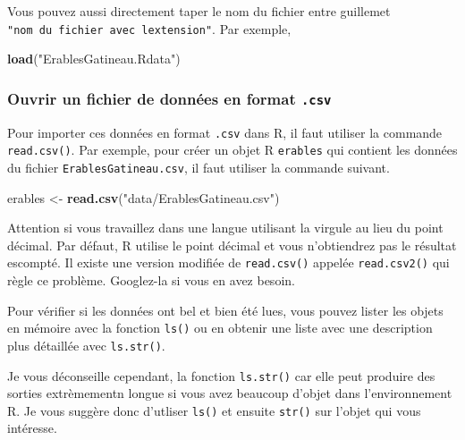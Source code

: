\documentclass[12pt,]{book}
\makeatletter
\newenvironment{Shaded}{\begin{snugshade}}{\end{snugshade}}
\newcommand{\KeywordTok}[1]{\textcolor[rgb]{0.27,0.27,0.27}{\textbf{#1}}}
\newcommand{\NormalTok}[1]{#1}
\newcommand{\StringTok}[1]{\textcolor[rgb]{0.5,0.5,0.5}{#1}}
\newenvironment{kframe}{%
\medskip{}
\setlength{\fboxsep}{.8em}
 \def\at@end@of@kframe{}%
 \ifinner\ifhmode%
  \def\at@end@of@kframe{\end{minipage}}%
  \begin{minipage}{\columnwidth}%
 \fi\fi%
 \def\FrameCommand##1{\hskip\@totalleftmargin \hskip-\fboxsep
 \colorbox{shadecolor}{##1}\hskip-\fboxsep
     \hskip-\linewidth \hskip-\@totalleftmargin \hskip\columnwidth}%
 \MakeFramed {\advance\hsize-\width
   \@totalleftmargin\z@ \linewidth\hsize
   \@setminipage}}%
 {\par\unskip\endMakeFramed%
 \at@end@of@kframe}
\newenvironment{rmdblock}[1]
  {
  \begin{itemize}
  \renewcommand{\labelitemi}{
    \raisebox{-.7\height}[0pt][0pt]{
      {\setkeys{Gin}{width=3em,keepaspectratio}\texttt{[image: images/\#1]}}
    }
  }
  \setlength{\fboxsep}{1em}
  \begin{kframe}
  \item
  }
  {
  \end{kframe}
  \end{itemize}
  }
\newenvironment{rmdtip}
  {\begin{rmdblock}{tip}}
  {\end{rmdblock}}
\newenvironment{rmdwarning}
  {\begin{rmdblock}{warning}}
  {\end{rmdblock}}
\makeatother
\begin{document}
Vous pouvez aussi directement taper le nom du fichier entre guillemet \texttt{"nom\ du\ fichier\ avec\ l\textquotesingle{}extension"}.
Par exemple,

\begin{Shaded}
\begin{Highlighting}[]
\KeywordTok{load}\NormalTok{(}\StringTok{"ErablesGatineau.Rdata"}\NormalTok{)}
\end{Highlighting}
\end{Shaded}

\hypertarget{ouvrir-un-fichier-de-donnuxe9es-en-format-.csv}{%
\subsubsection{\texorpdfstring{Ouvrir un fichier de données en format \texttt{.csv}}{Ouvrir un fichier de données en format .csv}}\label{ouvrir-un-fichier-de-donnuxe9es-en-format-.csv}}

Pour importer ces données en format \texttt{.csv} dans R, il faut utiliser la commande \texttt{read.csv()}.
Par exemple, pour créer un objet R \texttt{erables} qui contient les données du fichier \texttt{ErablesGatineau.csv}, il faut utiliser la commande suivant.

\begin{Shaded}
\begin{Highlighting}[]
\NormalTok{erables <-}\StringTok{ }\KeywordTok{read.csv}\NormalTok{(}\StringTok{"data/ErablesGatineau.csv"}\NormalTok{)}
\end{Highlighting}
\end{Shaded}

\begin{rmdwarning}
Attention si vous travaillez dans une langue utilisant la virgule au lieu du point décimal.
Par défaut, R utilise le point décimal et vous n'obtiendrez pas le résultat escompté.
Il existe une version modifiée de \texttt{read.csv()} appelée \texttt{read.csv2()} qui règle ce problème.
Googlez-la si vous en avez besoin.
\end{rmdwarning}

Pour vérifier si les données ont bel et bien été lues, vous pouvez lister les objets en mémoire avec la fonction \texttt{ls()} ou en obtenir une liste avec une description plus détaillée avec \texttt{ls.str()}.

\begin{rmdtip}
Je vous déconseille cependant, la fonction \texttt{ls.str()} car elle peut produire des sorties extrèmementn longue si vous avez beaucoup d'objet dans l'environnement R. Je vous suggère donc d'utliser \texttt{ls()} et ensuite \texttt{str()} sur l'objet qui vous intéresse.
\end{rmdtip}
\end{document}
